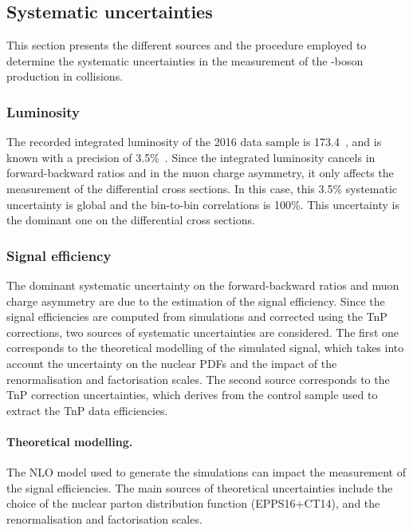 \subsection{Systematic uncertainties}\label{sec:WBoson_Analysis_Systematics}

This section presents the different sources and the procedure employed to determine the systematic uncertainties in the measurement of the \Wb-boson production in \RunpPb collisions. 

\subsubsection{Luminosity}

The recorded integrated luminosity of the 2016 \RunpPb data sample is 173.4~\nbinv, and is known with a precision of 3.5\%~\cite{LUM-17-002}. Since the integrated luminosity cancels in forward-backward ratios and in the muon charge asymmetry, it only affects the measurement of the \WToMuNu differential cross sections. In this case, this 3.5\% systematic uncertainty is global and the bin-to-bin correlations is 100\%. This uncertainty is the dominant one on the \WToMuNu differential cross sections.


\subsubsection{Signal efficiency}

The dominant systematic uncertainty on the forward-backward ratios and muon charge asymmetry are due to the estimation of the signal efficiency. Since the signal efficiencies are computed from simulations and corrected using the TnP corrections, two sources of systematic uncertainties are considered. The first one corresponds to the theoretical modelling of the simulated signal, which takes into account the uncertainty on the nuclear PDFs and the impact of the renormalisation and factorisation scales. The second source corresponds to the TnP correction uncertainties, which derives from the \ZToMuMu control sample used to extract the TnP data efficiencies.

\paragraph{Theoretical modelling.} The NLO model used to generate the simulations can impact the measurement of the signal efficiencies. The main sources of theoretical uncertainties include the choice of the nuclear parton distribution function (EPPS16+CT14), and the renormalisation and factorisation scales.

